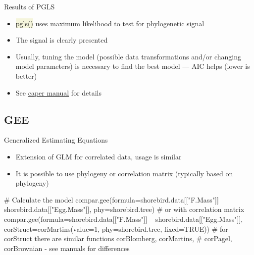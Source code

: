 \documentclass[compress, xelatex, 11pt, xcolor=svgnames, aspectratio=169,
	hyperref={
		bookmarks=true,
		unicode=true,
		colorlinks=true,
		pdftitle={Molecular data in R},
		plainpages=false,
		pdfauthor={Vojtech Zeisek},
		pdfsubject={Course about phylogeny and evolution in R},
		pdfcreator={XeLaTeX},
		pdfkeywords={R, evolution, phylogeny, molecular data},
		linkcolor=Crimson, %
		anchorcolor=Magenta, %
		citecolor=Magenta, %
		filecolor=Magenta, %
		menucolor=Magenta, %
		urlcolor=DodgerBlue, %
		},
	url={hyphens, lowtilde} %
	]{beamer}
\renewcommand{\texttt}[1]{\colorbox{Beige}{{\ttfamily #1}}}
\begin{document}
\begin{frame}{Results of PGLS}
	\begin{multicols}{2}
		\begin{center}
			\texttt{[image: shorebirds.png]}
		\end{center}
		\begin{itemize}
			\item \texttt{pgls()} uses maximum likelihood to test for phylogenetic signal
			\item The signal is clearly presented
			\item Usually, tuning the model (possible data transformations and/or changing model parameters) is necessary to find the best model --- AIC helps (lower is better)
			\item See \href{https://CRAN.R-project.org/package=caper}{caper manual} for details
		\end{itemize}
	\end{multicols}
\end{frame}

\subsection{GEE}

\begin{frame}[fragile]{Generalized Estimating Equations}
	\begin{itemize}
		\item Extension of GLM for correlated data, usage is similar
		\item It is possible to use phylogeny or correlation matrix (typically based on phylogeny)
	\end{itemize}
	\vfil
	\begin{spluscode}
    # Calculate the model
    compar.gee(formula=shorebird.data[["F.Mass"]] ~
      shorebird.data[["Egg.Mass"]], phy=shorebird.tree)
    # or with correlation matrix
    compar.gee(formula=shorebird.data[["F.Mass"]] ~
      shorebird.data[["Egg.Mass"]], corStruct=corMartins(value=1,
      phy=shorebird.tree, fixed=TRUE))
    # for corStruct there are similar functions corBlomberg, corMartins,
    # corPagel, corBrownian - see manuals for differences
	\end{spluscode}
\end{frame}
\end{document}
